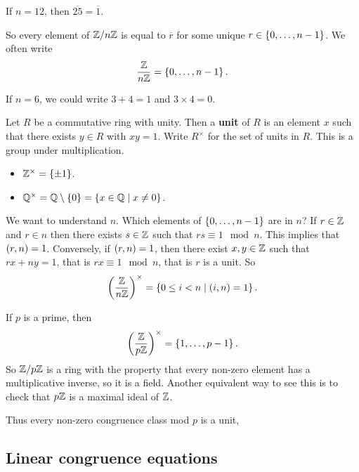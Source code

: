 \begin{example2}
If $ n = 12 $, then $ \overline{25} = \overline{1} $.
\end{example2}

So every element of $ \mathbb{Z} / n\mathbb{Z} $ is equal to $ \overline{r} $ for some unique $ r \in \left\{ 0, \dots, n - 1 \right\} $. We often write
$$ \dfrac{\mathbb{Z}}{n\mathbb{Z}} = \left\{ 0, \dots, n - 1 \right\}. $$

\begin{example2}
If $ n = 6 $, we could write $ 3 + 4 = 1 $ and $ 3 \times 4 = 0 $.
\end{example2}

Let $ R $ be a commutative ring with unity. Then a \textbf{unit} of $ R $ is an element $ x $ such that there exists $ y \in R $ with $ xy = 1 $. Write $ R^\times $ for the set of units in $ R $. This is a group under multiplication.

\begin{example2}
\hfill
\begin{itemize}
\item $ \mathbb{Z}^\times = \left\{ \pm 1 \right\} $.
\item $ \mathbb{Q}^\times = \mathbb{Q} \setminus \left\{ 0 \right\} = \left\{ x \in \mathbb{Q} \mid x \ne 0 \right\} $.
\end{itemize}
\end{example2}

We want to understand $ \unit{n} $. Which elements of $ \left\{ 0, \dots, n - 1 \right\} $ are in $ \unit{n} $? If $ r \in \mathbb{Z} $ and $ r \in \unit{n} $ then there exists $ s \in \mathbb{Z} $ such that $ rs \equiv 1 \mod n $. This implies that $ \left( r, n \right) = 1 $. Conversely, if $ \left( r, n \right) = 1 $, then there exist $ x, y \in \mathbb{Z} $ such that $ rx + ny = 1 $, that is $ rx \equiv 1 \mod n $, that is $ r $ is a unit. So
$$ \left( \dfrac{\mathbb{Z}}{n\mathbb{Z}} \right)^\times = \left\{ 0 \le i < n \mid \left( i, n \right) = 1 \right\}. $$

\begin{example2}
If $ p $ is a prime, then
$$ \left( \dfrac{\mathbb{Z}}{p\mathbb{Z}} \right)^\times = \left\{ 1, \dots, p - 1 \right\}. $$
So $ \mathbb{Z} / p\mathbb{Z} $ is a ring with the property that every non-zero element has a multiplicative inverse, so it is a field. Another equivalent way to see this is to check that $ p\mathbb{Z} $ is a maximal ideal of $ \mathbb{Z} $.
\end{example2}

Thus every non-zero congruence class mod $ p $ is a unit, 


\subsection{Linear congruence equations}

